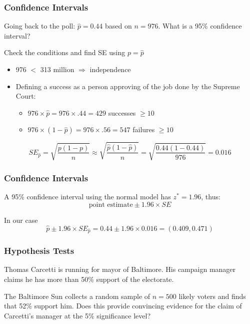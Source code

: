 \documentclass[slides]{beamer}
\newcommand{\blue}[1]{\textcolor{blue2}{#1}}
\newcommand{\phat}{\widehat{p}}
\begin{document}
\begin{frame}[fragile]
\frametitle{Confidence Intervals}

Going back to the poll: $\phat=0.44$ based on $n=976$.  What is a 95\% confidence interval?

\vspace{0.25cm}

\pause Check the conditions and find SE \blue{using $p=\phat$}

\begin{itemize}
\pause \item 976 $<$ 313 million $\Rightarrow$ independence
\pause \item Defining a success as a person approving of the job done by the Supreme Court:
\pause
\begin{itemize}
\item $976 \times \phat = 976 \times .44 = 429$ successes $\geq 10$
\item $976 \times (1-\phat) = 976 \times .56 = 547$ failures $\geq 10$
\end{itemize}
\end{itemize}
\pause
\[
SE_{\phat} = \sqrt{\frac{p(1-p)}{n}} \approx \sqrt{\frac{\phat(1-\phat)}{n}} = \sqrt{\frac{0.44(1-0.44)}{976}} = 0.016
\]
\end{frame}


\begin{frame}[fragile]
\frametitle{Confidence Intervals}

A 95\% confidence interval using the normal model has $z^*=1.96$, thus:
\[
\mbox{point estimate} \pm 1.96 \times SE
\]

\pause In our case
\[
\phat \pm 1.96\times SE_{\phat} = 0.44 \pm 1.96 \times 0.016 = (0.409, 0.471)
\]

\end{frame}


\begin{frame}[fragile]
\frametitle{Hypothesis Tests}
Thomas Carcetti is running for mayor of Baltimore.  His campaign manager \blue{claims} he has more than 50\% support of the electorate.  

\vspace{0.5cm}

\pause The Baltimore Sun collects a random sample of $n=500$ likely voters and finds that 52\% support him.  Does this provide convincing evidence for the claim of Carcetti's manager at the 5\% significance level?

\end{frame}
\end{document}

